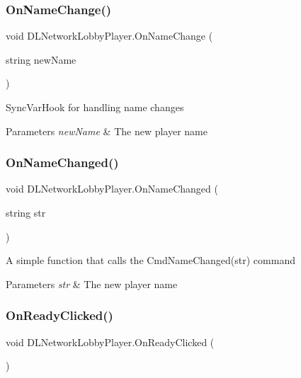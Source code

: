 \subsubsection{\texorpdfstring{On\+Name\+Change()}{OnNameChange()}}
{\footnotesize\ttfamily void D\+L\+Network\+Lobby\+Player.\+On\+Name\+Change (\begin{DoxyParamCaption}\item[{string}]{new\+Name }\end{DoxyParamCaption})}



Sync\+Var\+Hook for handling name changes 


\begin{DoxyParams}{Parameters}
{\em new\+Name} & The new player name\\
\hline
\end{DoxyParams}
\hypertarget{class_d_l_network_lobby_player_a3620f9df4e0e691e82287f5bdf12fff4}{}\label{class_d_l_network_lobby_player_a3620f9df4e0e691e82287f5bdf12fff4} 
\subsubsection{\texorpdfstring{On\+Name\+Changed()}{OnNameChanged()}}
{\footnotesize\ttfamily void D\+L\+Network\+Lobby\+Player.\+On\+Name\+Changed (\begin{DoxyParamCaption}\item[{string}]{str }\end{DoxyParamCaption})}



A simple function that calls the Cmd\+Name\+Changed(str) command 


\begin{DoxyParams}{Parameters}
{\em str} & The new player name\\
\hline
\end{DoxyParams}
\hypertarget{class_d_l_network_lobby_player_a5703c8531b9d4fd7c6987a9f26c43c5c}{}\label{class_d_l_network_lobby_player_a5703c8531b9d4fd7c6987a9f26c43c5c} 
\subsubsection{\texorpdfstring{On\+Ready\+Clicked()}{OnReadyClicked()}}
{\footnotesize\ttfamily void D\+L\+Network\+Lobby\+Player.\+On\+Ready\+Clicked (\begin{DoxyParamCaption}{ }\end{DoxyParamCaption})}




